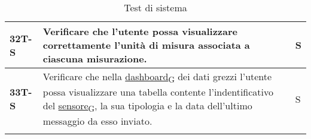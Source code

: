 \begin{longtable}{|>{\raggedright\arraybackslash}m{}|>{\raggedright\arraybackslash}m{}|>{\raggedright\arraybackslash}m{}|}
	\hline
	\textbf{32T-S}  & Verificare che l’utente possa visualizzare correttamente l’unità di misura associata a ciascuna misurazione.                                                                                                                                                                                                                                                                                             & S              \\
	\hline
	\textbf{33T-S}  & Verificare che nella \href{https://7last.github.io/docs/pb/documentazione-interna/glossario\#dashboard}{dashboard\textsubscript{G}} dei dati grezzi l'utente possa visualizzare una tabella contente l'indentificativo del \href{https://7last.github.io/docs/pb/documentazione-interna/glossario\#sensore}{sensore\textsubscript{G}}, la sua tipologia e la data dell'ultimo messaggio da esso inviato. & S              \\
	\hline
	\caption{Test di sistema}
\end{longtable}

